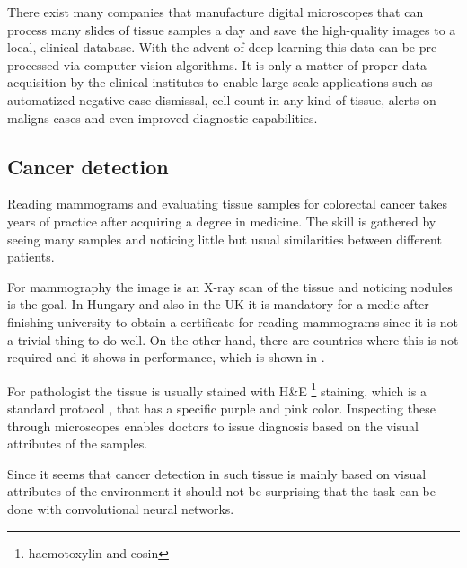\documentclass[a4paper,12pt]{article}
\begin{document}
\par There exist many companies that manufacture digital microscopes that can process many slides of tissue samples a day and save the high-quality images to a local, clinical database. With the advent of deep learning this data can be pre-processed via computer vision algorithms. It is only a matter of proper data acquisition by the clinical institutes to enable large scale applications such as automatized negative case dismissal, cell count in any kind of tissue, alerts on maligns cases and even improved diagnostic capabilities.

\vspace{7mm}

\subsection{Cancer detection}

\vspace{7mm}

\par Reading mammograms and evaluating tissue samples for colorectal cancer takes years of practice after acquiring a degree in medicine. The skill is gathered by seeing many samples and noticing little but usual similarities between different patients. 

\vspace{4mm}

\par For mammography the image is an X-ray scan of the tissue and noticing nodules is the goal. In Hungary and also in the UK it is mandatory for a medic after finishing university to obtain a certificate for reading mammograms since it is not a trivial thing to do well. On the other hand, there are countries where this is not required and it shows in performance, which is shown in \cite{mckinney2020international}.

\vspace{4mm}

\par For pathologist the tissue is usually stained with H\&E \footnote{haemotoxylin and eosin} staining, which is a standard protocol \cite{fischer2008hematoxylin}, that has a specific purple and pink color. Inspecting these through microscopes enables doctors to issue diagnosis based on the visual attributes of the samples.

\vspace{4mm}

\par Since it seems that cancer detection in such tissue is mainly based on visual attributes of the environment it should not be surprising that the task can be done with convolutional neural networks.
\end{document}
